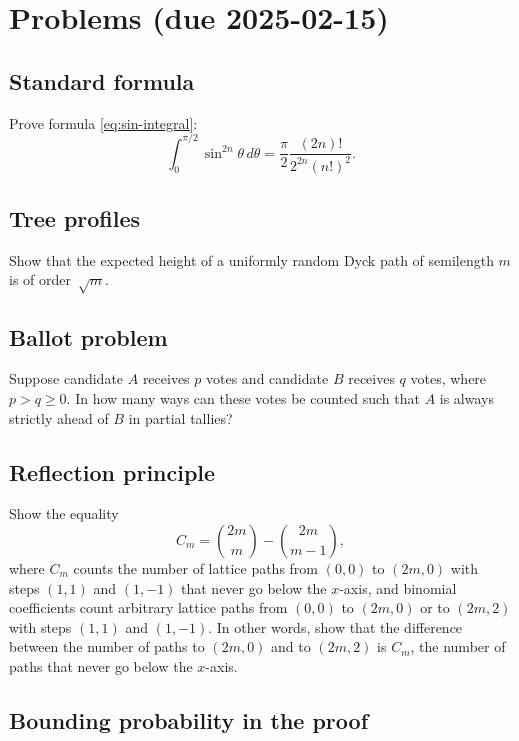 \documentclass[letterpaper,11pt,oneside,reqno]{article}
\numberwithin{equation}{section}
\theoremstyle{definition}
\begin{document}
\appendix
\setcounter{section}{1}

\section{Problems (due 2025-02-15)}

\subsection{Standard formula}
\label{prob:sin-integral}

Prove formula \eqref{eq:sin-integral}:
\begin{equation*}
	\int_0^{\pi/2} \sin^{2n}\theta\, d\theta = \frac{\pi}{2} \frac{(2n)!}{2^{2n} (n!)^2}.
\end{equation*}


\subsection{Tree profiles}
	Show that the expected height of a uniformly random Dyck path of semilength $m$ is of order~$\sqrt{m}$.

\subsection{Ballot problem}


Suppose candidate \(A\) receives \(p\) votes and candidate \(B\) receives \(q\) votes, where \(p > q \geq 0\). In how many ways can these votes be counted such that \(A\) is always strictly ahead of \(B\) in partial tallies?

\subsection{Reflection principle}
\label{prob:reflection-principle}

Show the equality
\begin{equation*}
	C_m=\binom{2m}{m}-\binom{2m}{m-1},
\end{equation*}
where $C_m$ counts the number of lattice paths 
from $(0,0)$ to $(2m,0)$ with steps $(1,1)$ and $(1,-1)$
that never go below the $x$-axis,
and binomial coefficients count 
arbitrary lattice paths from $(0,0)$ to $(2m,0)$ or 
to $(2m,2)$ with steps $(1,1)$ and $(1,-1)$.
In other words, show that the difference between the number of paths
to $(2m,0)$ and to $(2m,2)$ is $C_m$, the number of paths
that never go below the $x$-axis.

\subsection{Bounding probability in the proof}
\label{prob:chebyshev-like}
\end{document}
